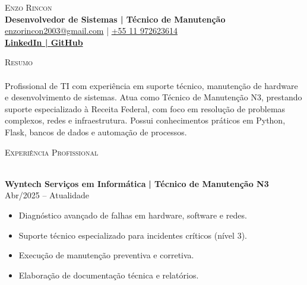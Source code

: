 \documentclass[a4paper]{article}
\newcommand{\lineunder}{
    \vspace*{-8pt} \\
    \hspace*{-18pt} \hrulefill \\
}
\newcommand{\header}[1]{
    {\hspace*{-18pt}\vspace*{6pt} \textsc{#1}}
    \vspace*{-6pt} \lineunder
}
\begin{document}
    \vspace*{-40pt}

    \vspace*{-2pt}
    \begin{center}
        {\Huge \scshape {Enzo Rincon}}\\
        \vspace*{2pt}
        \textbf{Desenvolvedor de Sistemas | Técnico de Manutenção}\\
        \vspace*{2pt}
        \href{mailto:enzorincon2003@gmail.com}{enzorincon2003@gmail.com} | \href{tel:+55 11 972623614}{+55 11 972623614}\\
        \vspace*{4pt}
        \textbf{\href{https://www.linkedin.com/in/enzorincon}{LinkedIn | }}\textbf{\href{https://github.com/Rincon23}{GitHub}}\\
    \end{center}

    \header{Resumo}
    \vspace{2mm}
    Profissional de TI com experiência em suporte técnico, manutenção de hardware e desenvolvimento de sistemas. Atua como Técnico de Manutenção N3, prestando suporte especializado à Receita Federal, com foco em resolução de problemas complexos, redes e infraestrutura. Possui conhecimentos práticos em Python, Flask, bancos de dados e automação de processos.
    \vspace{2mm}

    \header{Experiência Profissional}
    \vspace{2mm}

    \textbf{Wyntech Serviços em Informática}\textbf{ | Técnico de Manutenção N3} \hfill  Abr/2025 – Atualidade\\
    \vspace{-3mm}
    \begin{itemize} \itemsep -3pt
        \item Diagnóstico avançado de falhas em hardware, software e redes.
        \item Suporte técnico especializado para incidentes críticos (nível 3).
        \item Execução de manutenção preventiva e corretiva.
        \item Elaboração de documentação técnica e relatórios.
    \end{itemize}
\end{document}
